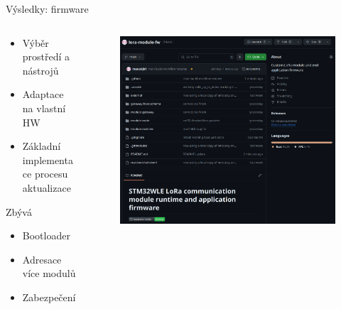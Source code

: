 \documentclass{beamer}
\begin{document}
\begin{frame}{Výsledky: firmware}
\begin{columns}[T]
\begin{column}{.35\textwidth}
    \begin{itemize}
        \item Výběr prostředí a\,nástrojů
        \item Adaptace na vlastní HW
        \item Základní implementace procesu aktualizace
    \end{itemize}
    Zbývá
    \begin{itemize}
        \item Bootloader
        \item Adresace více modulů
        \item Zabezpečení
    \end{itemize}
\end{column}%
\hfill%
\begin{column}{.70\textwidth}
    \begin{figure}[h]
        \centering
        \includegraphics[width=\linewidth]{img/firmware.png}
    \end{figure}
\end{column}%
\end{columns}
\end{frame}
\end{document}

